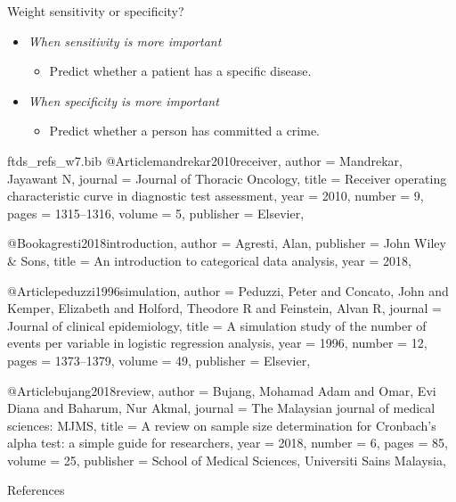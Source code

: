 \documentclass[10pt]{beamer}\usepackage[]{graphicx}\usepackage[]{xcolor}
\begin{document}
\begin{frame}[fragile]{Weight sensitivity or specificity?}
\begin{itemize}
\item \emph{When sensitivity is more important}
\begin{itemize}
\item Predict whether a patient has a specific disease.
\end{itemize}
\vb
\item \emph{When specificity is more important}
\begin{itemize}
\item Predict whether a person has committed a crime.
\end{itemize}
\end{itemize}
\end{frame}






\begin{filecontents}{ftds_refs_w7.bib}
@Article{mandrekar2010receiver,
  author    = {Mandrekar, Jayawant N},
  journal   = {Journal of Thoracic Oncology},
  title     = {Receiver operating characteristic curve in diagnostic test assessment},
  year      = {2010},
  number    = {9},
  pages     = {1315--1316},
  volume    = {5},
  publisher = {Elsevier},
}

@Book{agresti2018introduction,
  author    = {Agresti, Alan},
  publisher = {John Wiley \& Sons},
  title     = {An introduction to categorical data analysis},
  year      = {2018},
}

@Article{peduzzi1996simulation,
  author    = {Peduzzi, Peter and Concato, John and Kemper, Elizabeth and Holford, Theodore R and Feinstein, Alvan R},
  journal   = {Journal of clinical epidemiology},
  title     = {A simulation study of the number of events per variable in logistic regression analysis},
  year      = {1996},
  number    = {12},
  pages     = {1373--1379},
  volume    = {49},
  publisher = {Elsevier},
}

@Article{bujang2018review,
  author    = {Bujang, Mohamad Adam and Omar, Evi Diana and Baharum, Nur Akmal},
  journal   = {The Malaysian journal of medical sciences: MJMS},
  title     = {A review on sample size determination for Cronbach’s alpha test: a simple guide for researchers},
  year      = {2018},
  number    = {6},
  pages     = {85},
  volume    = {25},
  publisher = {School of Medical Sciences, Universiti Sains Malaysia},
}
\end{filecontents}

\let\origharvardyearright\harvardyearright
\makeatletter
\renewcommand\harvardyearright{\origharvardyearright\@ifnextchar,\@gobble\empty}
\makeatother

\begin{frame}{References}


\end{frame}
\end{document}
